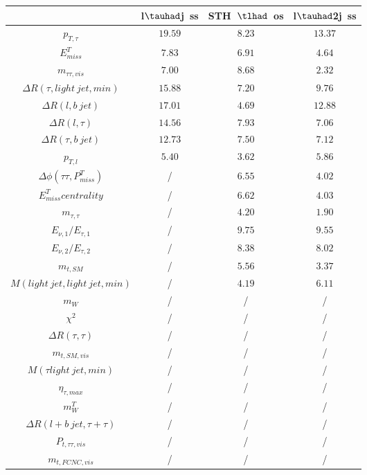 \centering
\begin{tabular}{|c|c|c|c|} \hline
 & l$\tauhad$j~ss & STH~$\tlhad$~os & l$\tauhad$2j~ss\\\hline
$p_{T,\tau }$ & $19.59$ & $8.23$ & $13.37$\\\hline
$E^{T}_{miss}$ & $7.83$ & $6.91$ & $4.64$\\\hline
$m_{\tau \tau ,vis}$ & $7.00$ & $8.68$ & $2.32$\\\hline
$\Delta R(\tau ,light~jet,min)$ & $15.88$ & $7.20$ & $9.76$\\\hline
$\Delta R(l,b~jet)$ & $17.01$ & $4.69$ & $12.88$\\\hline
$\Delta R(l,\tau )$ & $14.56$ & $7.93$ & $7.06$\\\hline
$\Delta R(\tau ,b~jet)$ & $12.73$ & $7.50$ & $7.12$\\\hline
$p_{T,l}$ & $5.40$ & $3.62$ & $5.86$\\\hline
$\Delta\phi(\tau \tau ,P^{T}_{miss})$ &  / & $6.55$ & $4.02$\\\hline
$E^{T}_{miss} centrality$ &  / & $6.62$ & $4.03$\\\hline
$m_{\tau ,\tau }$ &  / & $4.20$ & $1.90$\\\hline
$E_{\nu,1}/E_{\tau ,1}$ &  / & $9.75$ & $9.55$\\\hline
$E_{\nu,2}/E_{\tau ,2}$ &  / & $8.38$ & $8.02$\\\hline
$m_{t,SM}$ &  / & $5.56$ & $3.37$\\\hline
$M(light~jet,light~jet,min)$ &  / & $4.19$ & $6.11$\\\hline
$m_{W}$ &  / &  / &  /\\\hline
$\chi^{2}$ &  / &  / &  /\\\hline
$\Delta R(\tau ,\tau )$ &  / &  / &  /\\\hline
$m_{t,SM,vis}$ &  / &  / &  /\\\hline
$M(\tau  light~jet,min)$ &  / &  / &  /\\\hline
$\eta_{\tau ,max}$ &  / &  / &  /\\\hline
$m^{T}_{W}$ &  / &  / &  /\\\hline
$\Delta R(l+b~jet,\tau +\tau )$ &  / &  / &  /\\\hline
$P_{t,\tau \tau ,vis}$ &  / &  / &  /\\\hline
$m_{t,FCNC,vis}$ &  / &  / &  /\\\hline
\end{tabular}
